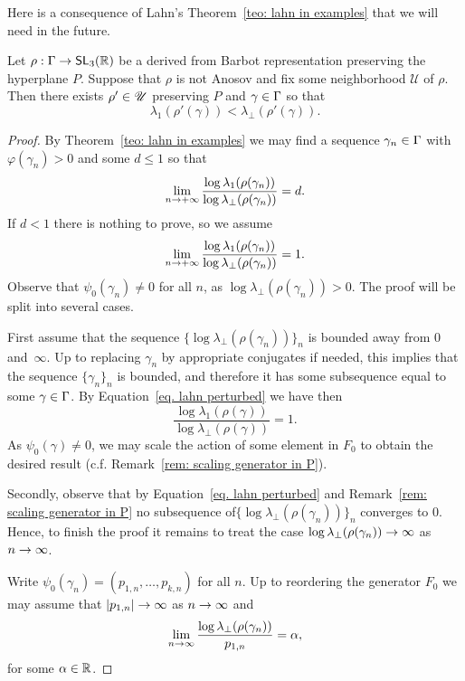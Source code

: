 \documentclass[AHL,Unicode,longabstracts]{cedram}
\DeclareMathOperator{\SL}{\mathsf{SL}}
\newcommand{\R}{\mathbb{R}}
\newcommand{\RR}{\R}
\newcommand{\scU}{\mathscr{U}}
\renewcommand*{\to}{\mathchoice{\longrightarrow}{\rightarrow}{\rightarrow}{\rightarrow}}
\let\oldin\in
\renewcommand{\in}{\mathchoice{\oldin}{\oldin}{\,\oldin\,}{\,\oldin\,}}
\newcommand{\RR}{\mathbb{R}}
\begin{document}
Here is a consequence of Lahn's Theorem~\ref{teo: lahn in examples} that we will need in the future.


\begin{coro}\label{cor. lahn with perturbation}
Let $\rho: \Gamma \to \SL_3(\RR)$ be a derived from Barbot representation preserving the hyperplane $P$. Suppose that $\rho$ is not Anosov and fix some neighborhood $\scU$ of $\rho$.
Then there exists $\rho'\in\scU$ preserving $P$ and $\gamma\in\Gamma$ so that
\[
\lambda_1(\rho'(\gamma))<\lambda_\perp(\rho'(\gamma)).
\]
\end{coro}



\begin{proof}
By Theorem~\ref{teo: lahn in examples} we may find a sequence $\gamma_n\in\Gamma$ with $\varphi(\gamma_n)>0$ and some $d\leq 1$ so that
\[
\lim_{n\to+\infty}\frac{\log\lambda_1(\rho(\gamma_n))}{\log\lambda_\perp(\rho(\gamma_n))}=d.
\]
If $d<1$ there is nothing to prove, so we assume
\begin{equation}\label{eq. lahn perturbed}
\lim_{n\to+\infty}\frac{\log\lambda_1(\rho(\gamma_n))}{\log\lambda_\perp(\rho(\gamma_n))}=1.
\end{equation}
Observe that $\psi_0(\gamma_n)\neq 0$ for all $n$, as $\log\lambda_\perp(\rho(\gamma_n))>0$. The proof will be split into several cases.

First assume that the sequence $\{\log\lambda_\perp(\rho(\gamma_n))\}_n$ is bounded away from $0$ and~$\infty$. Up to replacing $\gamma_n$ by appropriate conjugates if needed, this implies that the sequence $\{\gamma_n\}_n$ is bounded, and therefore it has some subsequence equal to some $\gamma\in\Gamma$.
By Equation~\eqref{eq. lahn perturbed} we have then
\[
\frac{\log\lambda_1(\rho(\gamma))}{\log\lambda_\perp(\rho(\gamma))}=1.
\]
As $\psi_0(\gamma)\neq 0$, we may scale the action of some element in $F_0$ to obtain the desired result (c.f. Remark~\ref{rem: scaling generator in P}).


Secondly, observe that by Equation~\eqref{eq. lahn perturbed} and Remark~\ref{rem: scaling generator in P} no subsequence of\linebreak $\{\log\lambda_\perp(\rho(\gamma_n))\}_n$ converges to $0$. Hence, to finish the proof it remains to treat the case $\log\lambda_\perp(\rho(\gamma_n))\to\infty$ as $n\to\infty$.



Write $\psi_0(\gamma_n)=(p_{1,n},\dots,p_{k,n})$ for all $n$. Up to reordering the generator $F_0$ we may assume that $\vert p_{1,n}\vert\to\infty$ as $n\to\infty$ and
\begin{equation}\label{eq. lahn perturbed II}
\lim_{n\to\infty}\frac{\log\lambda_\perp(\rho(\gamma_n))}{p_{1,n}}=\alpha,
\end{equation}
for some $\alpha\in\R$.


\end{proof}
\end{document}
